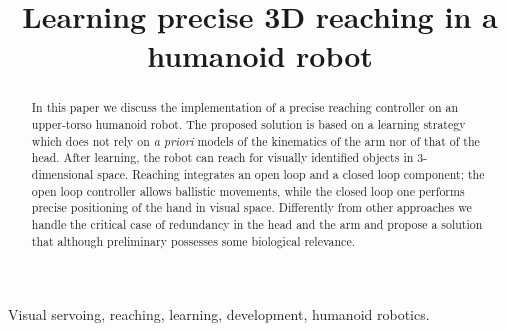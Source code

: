 \documentclass[conference,letterpaper]{ieeeconf}
\begin{document}
\title{\huge Learning precise 3D reaching in a humanoid robot}

\author{
\and
{}
}

\maketitle
\begin{abstract}
In this paper we discuss the implementation of a precise reaching controller 
on an upper-torso humanoid robot. The proposed solution is based on a 
learning strategy which does not rely on \emph{a priori} models of the 
kinematics of the arm nor of that of the head. After learning, the robot 
can reach for visually identified objects in 3-dimensional space. Reaching 
integrates an open loop and a closed loop component; the open loop controller allows 
ballistic movements, while the closed loop one performs precise positioning of 
the hand in visual space. Differently from other approaches we handle 
the critical case of redundancy in the head and the arm and propose a 
solution that although preliminary possesses some biological relevance.
\end{abstract}

\begin{keywords}
Visual servoing, reaching, learning, development, humanoid robotics.
\end{keywords}
%








%



\end{document}
